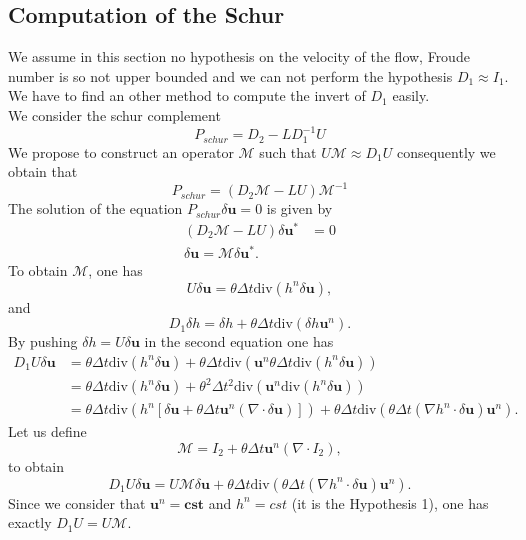 \documentclass[a4paper, 11pt]{report}
\begin{document}
\subsection{Computation of the Schur}
We assume in this section no hypothesis on the velocity of the flow, Froude number is so not upper bounded and we can not perform the hypothesis $D_1\approx I_1$. We have to find an other method to compute the invert of $D_1$ easily.\\ 
We consider the schur complement
$$
P_{schur}=D_2-LD_1^{-1}U
$$
We propose to construct an operator $\mathcal{M}$ such that $U \mathcal{M}\approx D_1 U$ consequently we obtain that 
$$
P_{schur}=(D_2 \mathcal{M}-LU)\mathcal{M}^{-1} 
$$
The solution of the equation $P_{schur}\delta \boldsymbol{u}=0$ is given by
\begin{align*}
(D_2\mathcal{M}-LU)\delta \boldsymbol{u}^* & =0\\
\delta \boldsymbol{u} = \mathcal{M} \delta \boldsymbol{u}^*.
\end{align*}
To obtain $\mathcal{M}$, one has 
\begin{equation*}
U\delta \boldsymbol{u}=\theta\Delta t\text{div}(h^n\delta \boldsymbol{u}),
\end{equation*}
and 
\begin{equation*}
D_1\delta h=\delta h+\theta\Delta t\text{div}(\delta h\boldsymbol{u}^n).
\end{equation*}
By pushing $\delta h=U\delta \boldsymbol{u}$ in the second equation one has
\begin{equation*}
\begin{split}
D_1U\delta \boldsymbol{u}&=\theta\Delta t\text{div}(h^n\delta \boldsymbol{u})+\theta\Delta t\text{div}(\boldsymbol{u}^n\theta\Delta t\text{div}(h^n\delta \boldsymbol{u}))\\
&=\theta\Delta t\text{div}(h^n\delta \boldsymbol{u})+\theta^2\Delta t^2\text{div}(\boldsymbol{u}^n\text{div}(h^n\delta\boldsymbol{u}))\\
&=\theta\Delta t\text{div}\left(h^n\left[\delta \boldsymbol{u}+\theta\Delta t\boldsymbol{u}^n(\nabla\cdot \delta \boldsymbol{u})\right]\right)+\theta\Delta t\text{div}(\theta\Delta t\left(\nabla h^n\cdot \delta \boldsymbol{u}\right)\boldsymbol{u}^n).
\end{split}
\end{equation*}
Let us define 
\begin{equation*}
\mathcal{M}=I_2+\theta\Delta t\boldsymbol{u}^n(\nabla\cdot I_2),
\end{equation*}
to obtain
\begin{equation*}
D_1U\delta \boldsymbol{u}=U\mathcal{M}\delta \boldsymbol{u}+\theta\Delta t\text{div}(\theta\Delta t\left(\nabla h^n\cdot \delta \boldsymbol{u}\right)\boldsymbol{u}^n).
\end{equation*}
Since we consider that $\boldsymbol{u}^n=\boldsymbol{cst}$ and $h^n=cst$ (it is the Hypothesis 1), one has exactly $D_1U=U\mathcal{M}$.
\end{document}
